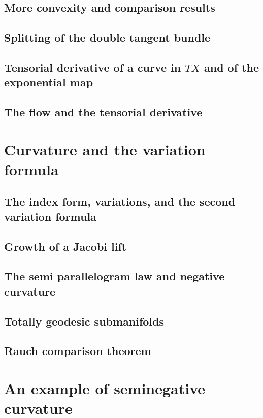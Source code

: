 \documentclass[a4paper]{article}
\begin{document}
\subsection{More convexity and comparison results}

\subsection{Splitting of the double tangent bundle}

\subsection{Tensorial derivative of a curve in $TX$ and of the exponential map}

\subsection{The flow and the tensorial derivative}

\section{Curvature and the variation formula}

\subsection{The index form, variations, and the second variation formula}

\subsection{Growth of a Jacobi lift}

\subsection{The semi parallelogram law and negative curvature}

\subsection{Totally geodesic submanifolds}

\subsection{Rauch comparison theorem}

\section{An example of seminegative curvature}
\end{document}

